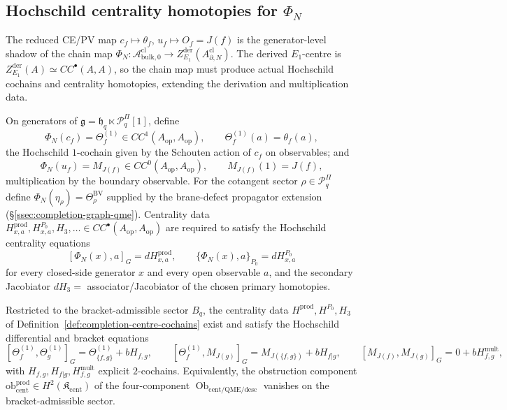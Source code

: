 \subsection{\texorpdfstring{Hochschild centrality homotopies for \(\Phi_N\)}{Hochschild centrality homotopies for -N}}
\label{ssec:completion-hochschild-centrality}

The reduced CE/PV map \(c_f\mapsto\theta_f\), \(u_f\mapsto O_f=J(f)\)
is the generator-level shadow of the chain map
\(\Phi_N:\mathcal A^{\mathrm{cl}}_{\mathrm{bulk},0}\to
Z^{\mathrm{der}}_{E_1}(A^{\mathrm{cl}}_{\partial,N})\).  The
derived \(E_1\)-centre is
\(Z^{\mathrm{der}}_{E_1}(A)\simeq CC^\bullet(A,A)\), so the chain
map must produce actual Hochschild cochains and centrality
homotopies, extending the derivation and multiplication data.

\begin{defn}
\label{def:completion-centre-cochains}
On generators of \(\mathfrak g=\mathfrak h_q\ltimes
\mathcal P^\Pi_q[1]\), define
\[
  \Phi_N(c_f)=\Theta^{(1)}_f\in CC^1(A_{\mathrm{op}},A_{\mathrm{op}}),
  \qquad
  \Theta^{(1)}_f(a)=\theta_f(a),
\]
the Hochschild \(1\)-cochain given by the Schouten action of \(c_f\)
on observables; and
\[
  \Phi_N(u_f)=M_{J(f)}\in CC^0(A_{\mathrm{op}},A_{\mathrm{op}}),
  \qquad
  M_{J(f)}(1)=J(f),
\]
multiplication by the boundary observable.  For the cotangent
sector \(\rho\in\mathcal P^\Pi_q\) define
\(\Phi_N(\eta_\rho)=\Theta^{\mathrm{BV}}_\rho\) supplied by the
brane-defect propagator extension
(\S\ref{ssec:completion-graph-qme}).  Centrality data
\(H^{\mathrm{prod}}_{x,a},H^{P_0}_{x,a},H_3,\ldots\in
CC^\bullet(A_{\mathrm{op}},A_{\mathrm{op}})\) are required to
satisfy the Hochschild centrality equations
\[
  [\Phi_N(x),a]_G=dH^{\mathrm{prod}}_{x,a},
  \qquad
  \{\Phi_N(x),a\}_{P_0}=dH^{P_0}_{x,a}
\]
for every closed-side generator \(x\) and every open observable
\(a\), and the secondary Jacobiator
\(dH_3=\) associator/Jacobiator of the chosen primary homotopies.
\end{defn}

\begin{thm}
\label{thm:completion-centrality-homotopies}
Restricted to the bracket-admissible sector \(B_q\), the centrality
data \(H^{\mathrm{prod}},H^{P_0},H_3\) of
Definition~\ref{def:completion-centre-cochains} exist and satisfy
the Hochschild differential and bracket equations
\[
  [\Theta^{(1)}_f,\Theta^{(1)}_g]_G
  =\Theta^{(1)}_{\{f,g\}}+bH_{f,g},
  \qquad
  [\Theta^{(1)}_f,M_{J(g)}]_G=M_{J(\{f,g\})}+bH_{f|g},
  \qquad
  [M_{J(f)},M_{J(g)}]_G=0+bH^{\mathrm{mult}}_{f,g},
\]
with \(H_{f,g},H_{f|g},H^{\mathrm{mult}}_{f,g}\) explicit
\(2\)-cochains.  Equivalently, the obstruction component
\(\mathrm{ob}^{\mathrm{prod}}_{\mathrm{cent}}\in
H^2(\mathfrak K_{\mathrm{cent}})\) of the four-component
\(\operatorname{Ob}_{\mathrm{cent/QME/desc}}\) vanishes on the
bracket-admissible sector.
\end{thm}

